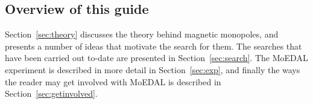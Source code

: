 \subsection{Overview of this guide}
\label{sec:overview}
Section~\ref{sec:theory} discusses the theory behind magnetic monopoles,
and presents a number of ideas that motivate the search for them.
The searches that have been carried out to-date are presented in
Section~\ref{sec:search}.
The MoEDAL experiment is described in more detail in
Section~\ref{sec:exp}, and finally the ways the reader may get involved
with MoEDAL is described in Section~\ref{sec:getinvolved}.
